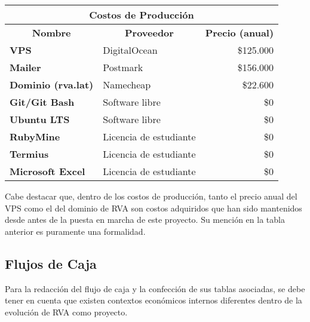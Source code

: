 \begin{center}
	\begin{tabular}{ | l | p{5cm} | p{5cm}|}
		\hline
		\multicolumn{3}{|c|}{\textbf{Costos de Producción}} \\
		\hline
		\multicolumn{1}{|c|}{\textbf{Nombre}} & \multicolumn{1}{|c|}{\textbf{Proveedor}} & \multicolumn{1}{|c|}{\textbf{Precio (anual)}} \\
		\hline
		{\textbf{VPS}} & DigitalOcean & \multicolumn{1}{|r|}{\$125.000} \\ \hline
		
		{\textbf{Mailer}} & Postmark & \multicolumn{1}{|r|}{\$156.000} \\ \hline
		
		{\textbf{Dominio (rva.lat)}} & Namecheap & \multicolumn{1}{|r|}{\$22.600} \\ \hline
		
		{\textbf{Git/Git Bash}} & Software libre & \multicolumn{1}{|r|}{\$0} \\ \hline
		
		{\textbf{Ubuntu LTS}} & Software libre & \multicolumn{1}{|r|}{\$0} \\ \hline
		
		{\textbf{RubyMine}} & Licencia de estudiante & \multicolumn{1}{|r|}{\$0} \\ \hline
		
		{\textbf{Termius}} & Licencia de estudiante & \multicolumn{1}{|r|}{\$0} \\ \hline
		
		{\textbf{Microsoft Excel}} & Licencia de estudiante & \multicolumn{1}{|r|}{\$0} \\ \hline
	\end{tabular}
\end{center}

Cabe destacar que, dentro de los costos de producción, tanto el precio anual del VPS como el del dominio de RVA son costos adquiridos que han sido mantenidos desde antes de la puesta en marcha de este proyecto. Su mención en la tabla anterior es puramente una formalidad.

\subsection{Flujos de Caja}
Para la redacción del flujo de caja y la confección de sus tablas asociadas, se debe tener en cuenta que existen contextos económicos internos diferentes dentro de la evolución de RVA como proyecto.

